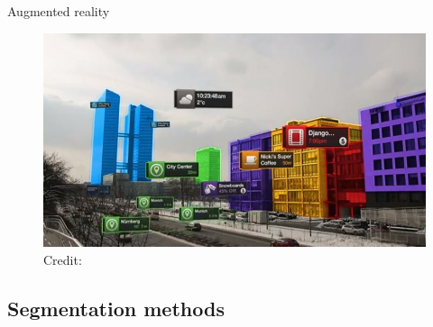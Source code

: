 \documentclass[12]{beamer}
\begin{document}
\begin{frame}{Augmented reality}

\begin{figure}
\includegraphics[width=\textwidth]{applications_vr}
\hspace*{5pt}\hbox{\scriptsize Credit:}
\end{figure}

\end{frame}

\subsection{Segmentation methods}
\end{document}
